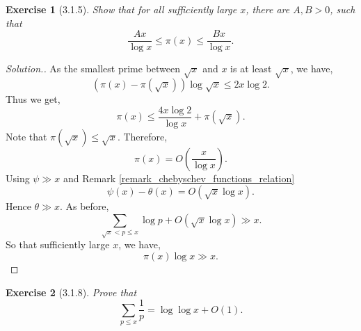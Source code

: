 \documentclass{article}
\newtheorem{exercise}{Exercise}[section]
\begin{document}
\begin{exercise}[3.1.5]
  Show that for all sufficiently large $x$, there are $A,B>0$, such that
  \begin{equation*}
    {\frac {Ax} {\log x}}\leq \pi(x)\leq {\frac {Bx} {\log x}}.
  \end{equation*}
\end{exercise}

\begin{proof}[Solution.]
As the smallest prime between $\sqrt{x}$ and $x$ is at least $\sqrt{x}$, we have,
\begin{equation*}
  (\pi(x)-\pi(\sqrt{x}))\log\sqrt{x}\leq2x\log 2.
\end{equation*}
Thus we get,
\begin{equation*}
  \pi(x)\leq {\frac {4x\log 2}{\log x}}+\pi(\sqrt{x}).
\end{equation*}
Note that $\pi(\sqrt{x})\leq \sqrt{x}$. Therefore,
\begin{equation*}
  \pi(x)=O\left({\frac {x} {\log x}}\right).
\end{equation*}
Using $\psi\gg x$ and Remark \ref{remark_chebyschev_functions_relation}
\begin{equation*}
  \psi(x)-\theta(x)=O(\sqrt{x}\log x).
\end{equation*}
Hence $\theta\gg x$. As before,
\begin{equation*}
  \sum_{\sqrt{x}<p\leq x}\log p +O(\sqrt{x}\log x) \gg x.
\end{equation*}
So that sufficiently large $x$, we have, 
\begin{equation*}
  \pi(x)\log x \gg x.
\end{equation*}
\end{proof}

\begin{exercise}[3.1.8]
  Prove that
  \begin{equation*}
    \sum_{p\leq x}{\frac 1 p} = \log\log x +O(1).
  \end{equation*}
  \label{exercise_3.1.8}
\end{exercise}
\end{document}
